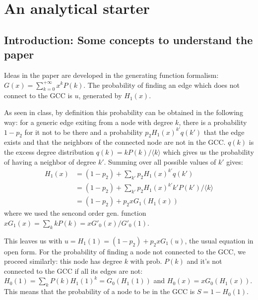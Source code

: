 \chapter{An analytical starter}


\section{Introduction: Some concepts to understand the paper}
Ideas in the paper are developed in the generating function formalism: $G(x) = \sum_{k=0}^{+\infty} x^k P(k)$. The probability of finding an edge which does not connect to the GCC is $u$, generated by $H_1(x)$.

As seen in class, by definition this probability can be obtained in the following way: for a generic edge exiting from a node with degree $k$, there is a probability $1 - p_2$ for it not to be there and a probability $p_2 H_1(x) ^{k'} q(k')$ that the edge exists and that the neighbors of the connected node are not in the GCC. $q(k)$ is the excess degree distribution $q(k) = kP(k)/\langle k\rangle$ which gives us the probability of having a neighbor of degree $k'$. Summing over all possible values of $k'$ gives:
\begin{align}
    H_1(x) &= (1-p_2) + \sum_{k'}p_2 H_1(x) ^{k'} q(k') \\
    &= (1-p_2) + \sum_{k'}p_2 H_1(x) ^{k'} k'P(k')/\langle k\rangle \\
    &= (1-p_2) + p_2 xG_1(H_1(x))
\end{align}
where we used the sencond order gen. function $xG_1(x) = \sum_{k}kP(k) = xG'_0(x)/G'_0(1)$.

This leaves us with $u = H_1(1) = (1-p_2) + p_2 xG_1(u)$, the usual equation in open form.
For the probability of finding a node not connected to the GCC, we proceed similarly: this node has degree $k$ with prob. $P(k)$ and it's not connected to the GCC if all its edges are not: $H_0(1) = \sum_{k} P(k)H_1(1)^k = G_0(H_1(1))$ and $H_0(x) = xG_0(H_1(x))$. This means that the probability of a node to be in the GCC is $S = 1 - H_0(1)$.

